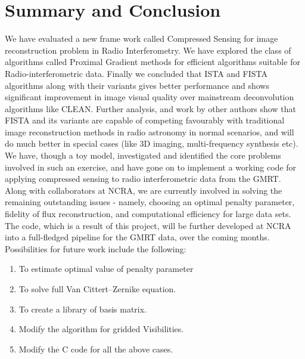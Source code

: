 \chapter{Summary and Conclusion}
\label{c:conclusion}

We have evaluated a new frame work called Compressed Sensing for image reconstruction
problem in Radio Interferometry. We have explored the class of algorithms
called Proximal Gradient methods for efficient algorithms suitable
for Radio-interferometric data. Finally we concluded that ISTA and FISTA
algorithms along with their variants gives better performance and shows significant improvement 
in image visual quality over mainstream deconvolution algorithms like CLEAN. 
Further analysis, and work by other authors show that FISTA and its 
variants are capable of competing favourably with traditional image reconstruction methods 
in radio astronomy in normal scenarios, and will do much better in special cases (like 3D imaging,
multi-frequency synthesis etc). We have, though a toy model, investigated and identified the core
problems involved in such an exercise, and have gone on to implement a working code for applying compressed
sensing to radio interferometric data from the GMRT. Along with collaborators at NCRA, we are
currently involved in solving the remaining outstanding issues - namely, choosing an optimal penalty parameter,
fidelity of flux reconstruction, and computational efficiency for large data sets. The code, which is a result
of this project, will be further developed at NCRA into a full-fledged pipeline for the GMRT data, over the coming
months. Possibilities for future work include the following:
\begin{enumerate}

\item  To estimate optimal value of penalty parameter
\item  To solve full Van Cittert–Zernike equation.
\item  To create a library of basis matrix.
\item  Modify the algorithm for gridded Visibilities.
\item  Modify the C code for all the above cases.

\end{enumerate}
